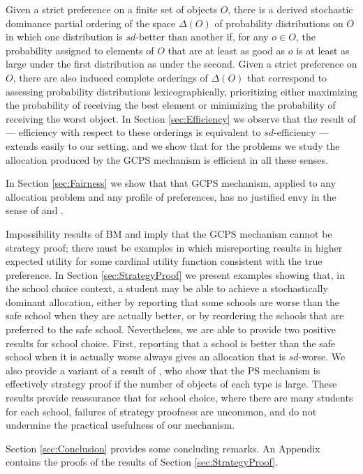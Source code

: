 \documentclass[12pt]{article}
\theoremstyle{definition}
\begin{document}
Given a strict preference on a finite set of objects $O$, there is a derived stochastic dominance partial ordering of the space $\Delta(O)$ of probability distributions on $O$ in which one distribution is $sd$-better than another if, for any $o \in O$, the probability assigned to elements of $O$ that are at least as good as $o$ is at least as large under the first distribution as under the second.  Given a strict preference on $O$, there are also induced complete orderings of $\Delta(O)$ that correspond to assessing probability distributions lexicographically, prioritizing either maximizing the probability of receiving the best element or minimizing the probability of receiving the worst object.  
In Section \ref{sec:Efficiency} we observe that the result of
\cite{cd16} --- efficiency with respect to these orderings is equivalent to $sd$-efficiency --- extends easily to our setting, and  we show that for the problems we study the allocation produced by the GCPS mechanism is efficient in all these senses.  

In Section \ref{sec:Fairness} we show that that GCPS mechanism, applied to any allocation problem and any profile of preferences, has no justified envy in the sense of \cite{as03aer} and \cite{yilmaz10geb}.

Impossibility results of BM and \citet{yilmaz10geb} imply that the GCPS mechanism cannot be strategy proof; there must be examples in which misreporting results in higher expected utility for some cardinal utility function consistent with the true preference.  In  Section \ref{sec:StrategyProof} we present examples showing that, in the school choice context, a student may be able to achieve a stochastically dominant allocation, either by reporting that some schools are worse than the safe school when they are actually better, or by reordering the schools that are preferred to the safe school.
Nevertheless, we are able to provide two positive results for school choice.  First, reporting that a school is better than the safe school when it is actually worse always gives an allocation that is $sd$-worse.  We also provide a variant of a result of  
\cite{km10jet}, who show that the PS mechanism is effectively strategy proof if the number of objects of each type is large.  These results provide reassurance that for school choice, where there are many students for each school, failures of strategy proofness are uncommon, and do not undermine the practical usefulness of our mechanism.

Section \ref{sec:Conclusion} provides some concluding remarks.  An Appendix contains the proofs of the results of Section \ref{sec:StrategyProof}.
\end{document}

